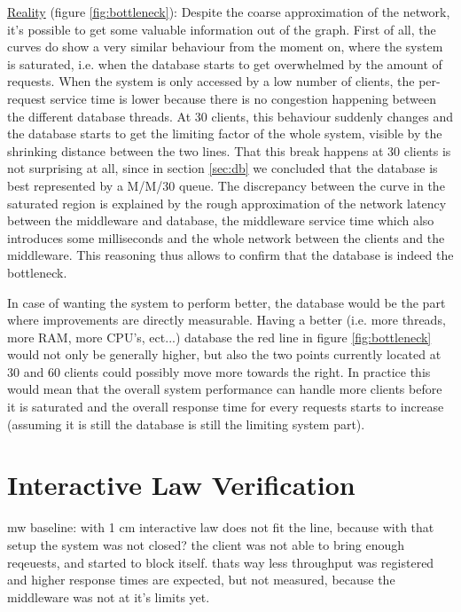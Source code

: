 \documentclass[11pt]{article}
\begin{document}
\newline\underline{Reality} (figure \ref{fig:bottleneck}): Despite the coarse approximation of the network, it's possible to get some valuable information out of the graph. First of all, the curves do show a very similar behaviour from the moment on, where the system is saturated, i.e. when the database starts to get overwhelmed by the amount of requests. When the system is only accessed by a low number of clients, the per-request service time is lower because there is no congestion happening between the different database threads. At 30 clients, this behaviour suddenly changes and the database starts to get the limiting factor of the whole system, visible by the shrinking distance between the two lines. That this break happens at 30 clients is not surprising at all, since in section \ref{sec:db} we concluded that the database is best represented by a M/M/30 queue. The discrepancy between the curve in the saturated region is explained by the rough approximation of the network latency between the middleware and database, the middleware service time which also introduces some milliseconds and the whole network between the clients and the middleware. This reasoning thus allows to confirm that the database is indeed the bottleneck.

In case of wanting the system to perform better, the database would be the part where improvements are directly measurable. Having a better (i.e. more threads, more RAM, more CPU's, ect...) database the red line in figure \ref{fig:bottleneck} would not only be generally higher, but also the two points currently located at 30 and 60 clients could possibly move more towards the right. In practice this would mean that the overall system performance can handle more clients before it is saturated and the overall response time for every requests starts to increase (assuming it is still the database is still the limiting system part).

\section{Interactive Law Verification}\label{sec:interactive-law}

mw baseline: with 1 cm interactive law does not fit the line, because with that setup the system was not closed? the client was not able to bring enough reqeuests, and started to block itself. thats way less throughput was registered and higher response times are expected, but not measured, because the middleware was not at it's limits yet.
\end{document}
